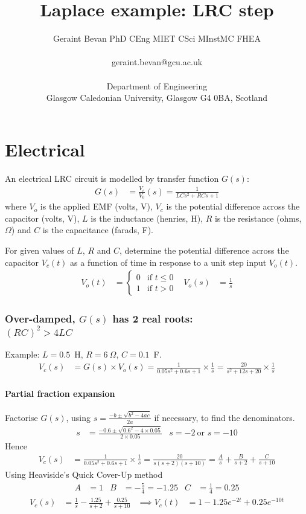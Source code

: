 \documentclass[a4paper,12pt]{article}
\title{Laplace example: LRC step}
\author{Geraint Bevan
  {\small
    PhD CEng MIET CSci MInstMC FHEA}
  \\\ \\
  geraint.bevan@gcu.ac.uk
  \\\ \\
  Department of Engineering\\
  Glasgow Caledonian University,
  Glasgow G4 0BA, Scotland}
\begin{document}
\maketitle

\part{Electrical}
An electrical LRC circuit is modelled by transfer function $G(s)$:
\begin{align*}
  G(s) &= \frac{V_c}{V_{0}}(s) = \frac{1}{L C s^2 + R C s + 1}
\end{align*}
where $V_o$ is the applied EMF (volts, V), $V_c$ is the potential difference across the capacitor (volts, V),
$L$ is the inductance (henries, H), $R$ is the resistance (ohms, $\Omega$) and $C$ is the capacitance (farads, F).

For given values of $L$, $R$ and $C$, determine the potential difference across the capacitor $V_c(t)$ as a function of time in response to a unit step input $V_o(t)$.
\begin{align*}
  V_o(t) &= \begin{cases} 0 & \text{if } t \leq 0 \\ 1 & \text{if } t > 0 \end{cases} &
  V_o(s) &= \frac{1}{s}
\end{align*}

\newpage
\section*{Over-damped, $G(s)$ has 2 real roots:\\ $(RC)^2>4LC $}
Example: $L=0.5$~H, $R=6~\Omega$, $C=0.1$~F. %
\begin{align*}
  V_c(s) &= G(s) \times V_o(s)
  = \frac{1}{0.05 s^2 + 0.6 s + 1} \times \frac{1}{s}
  = \frac{20}{s^2 + 12 s + 20} \times \frac{1}{s}
\end{align*}

\subsection*{Partial fraction expansion}
Factorise $G(s)$, using $s = \frac{-b\pm\sqrt{b^2-4ac}}{2a}$ if necessary, to find the denominators.
\begin{align*}
  s &= \frac{-0.6\pm\sqrt{0.6^2-4\times 0.05}}{2\times 0.05} & s=-2~\text{or }s=-10
\end{align*}
Hence
\begin{align*}
  V_c(s) &=\frac{1}{0.05 s^2 + 0.6 s + 1} \times \frac{1}{s}
  = \frac{20}{s(s+2)(s+10)}
  = \frac{A}{s} + \frac{B}{s+2} + \frac{C}{s+10}
\end{align*}
Using Heaviside's Quick Cover-Up method
\begin{align*}
  A &= 1 & B &= -\frac{5}{4} = -1.25 & C &= \frac{1}{4} = 0.25
\end{align*}
\begin{align*}
  V_c(s) &= \frac{1}{s} - \frac{1.25}{s+2} + \frac{0.25}{s+10} &\implies
  V_c(t) &= 1 - 1.25 e^{-2t} + 0.25 e^{-10t}
\end{align*}
\end{document}
